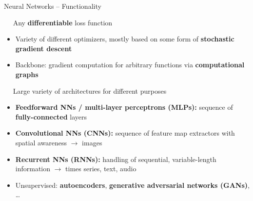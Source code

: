 
\begin{frame}{Neural Networks -- Functionality}

\footnotesize

 ~~ Any \textbf{differentiable} loss function

\medskip


\begin{itemize}
  \item Variety of different optimizers, mostly based on some form of 
  \textbf{stochastic gradient descent}
  \item Backbone: gradient computation for arbitrary functions via 
  \textbf{computational graphs}
\end{itemize}

\medskip

 ~~ Large variety of architectures for different purposes
\begin{itemize}
  \item \textbf{Feedforward NNs / multi-layer perceptrons (MLPs):} sequence of 
  \textbf{fully-connected} layers
  \item \textbf{Convolutional NNs (CNNs):} sequence of feature map extractors 
  with spatial awareness $\rightarrow$ images
  \item \textbf{Recurrent NNs (RNNs):} handling of sequential, variable-length 
  information $\rightarrow$ times series, text, audio
  \item Unsupervised: \textbf{autoencoders}, \textbf{generative adversarial 
  networks (GANs)}, \dots
\end{itemize}



\end{frame}

